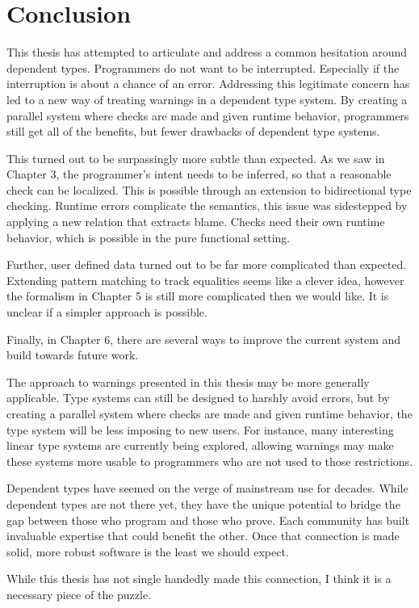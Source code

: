 \chapter{Conclusion}
\label{chapter:Conclusion}
\thispagestyle{myheadings}

This thesis has attempted to articulate and address a common hesitation around dependent types.
Programmers do not want to be interrupted.
Especially if the interruption is about a chance of an error.
Addressing this legitimate concern has led to a new way of treating warnings in a dependent type system.
By creating a parallel system where checks are made and given runtime behavior, programmers still get all of the benefits, but fewer drawbacks of dependent type systems.

This turned out to be surpassingly more subtle than expected.
As we saw in Chapter 3, the programmer's intent needs to be inferred, so that a reasonable check can be localized.
This is possible through an extension to bidirectional type checking.
Runtime errors complicate the semantics, this issue was sidestepped by applying a new relation that extracts blame.
Checks need their own runtime behavior, which is possible in the pure functional setting.

Further, user defined data turned out to be far more complicated than expected.
Extending pattern matching to track equalities seems like a clever idea, however the formalism in Chapter 5 is still more complicated then we would like.
It is unclear if a simpler approach is possible.

Finally, in Chapter 6, there are several ways to improve the current system and build towards future work.

The approach to warnings presented in this thesis may be more generally applicable.
Type systems can still be designed to harshly avoid errors, but by creating a parallel system where checks are made and given runtime behavior, the type system will be less imposing to new users.
For instance, many interesting linear type systems are currently being explored, allowing warnings may make these systems more usable to programmers who are not used to those restrictions.

Dependent types have seemed on the verge of mainstream use for decades.
While dependent types are not there yet, they have the unique potential to bridge the gap between those who program and those who prove.
Each community has built invaluable expertise that could benefit the other.
Once that connection is made solid, more robust software is the least we should expect.

While this thesis has not single handedly made this connection, I think it is a necessary piece of the puzzle.

